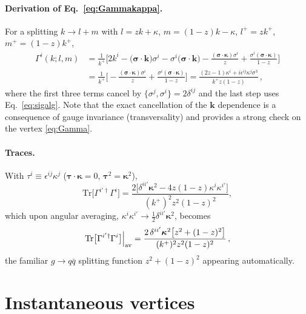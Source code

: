 \documentclass[11pt]{article}
\newcommand{\dg}{\dagger}
\newcommand{\Gam}{\Gamma}
\begin{document}
\paragraph{Derivation of Eq.~\eqref{eq:Gammakappa}.} For a splitting $k\to l+m$ with
$l=zk+\kappa$, $m=(1-z)k-\kappa$, $l^+=zk^+$, $m^+=(1-z)k^+$,
\begin{align}
\Gam^i(k;l,m)&=\frac{1}{k^+}\Big[2k^i-\big(\bm\sigma\!\cdot\!\bm k\big)\sigma^i
-\sigma^i\big(\bm\sigma\!\cdot\!\bm k\big)
-\frac{(\bm\sigma\!\cdot\!\bm\kappa)\sigma^i}{z}+\frac{\sigma^i(\bm\sigma\!\cdot\!\bm\kappa)}{1-z}\Big]
\nonumber\\
&=\frac{1}{k^+}\Big[-\frac{(\bm\sigma\!\cdot\!\bm\kappa)\sigma^i}{z}
+\frac{\sigma^i(\bm\sigma\!\cdot\!\bm\kappa)}{1-z}\Big]
=\frac{(2z-1)\kappa^i+i\epsilon^{ij}\kappa^j\sigma^3}{k^+z(1-z)}\,,
\end{align}
where the first three terms cancel by $\{\sigma^j,\sigma^i\}=2\delta^{ij}$ and the last step uses
Eq.~\eqref{eq:sigalg}. Note that the exact cancellation of the $\bm k$ dependence is a
consequence of gauge invariance (transversality) and provides a strong check on the vertex
\eqref{eq:Gamma}.

\paragraph{Traces.} With $\tau^i\equiv\epsilon^{ij}\kappa^j$ ($\bm\tau\!\cdot\!\bm\kappa=0$,
$\bm\tau^2=\bm\kappa^2$),
\begin{equation}
\mathrm{Tr}\big[\Gam^{i'\dg}\Gam^{i}\big]
=\frac{2\big[\delta^{ii'}\bm\kappa^2-4z(1-z)\kappa^i\kappa^{i'}\big]}{(k^+)^2z^2(1-z)^2},
\end{equation}
which upon angular averaging, $\kappa^i\kappa^{i'}\to\tfrac12\delta^{ii'}\bm\kappa^2$, becomes
\begin{equation}
\mathrm{Tr}\big[\Gam^{i'\dg}\Gam^{i}\big]\Big|_{\rm av}
=\frac{2\,\delta^{ii'}\bm\kappa^2\big[z^2+(1-z)^2\big]}{(k^+)^2z^2(1-z)^2}\,,
\end{equation}
the familiar $g\to q\bar q$ splitting function $z^2+(1-z)^2$ appearing automatically.

\section{Instantaneous vertices}
\label{app:inst}
\end{document}

